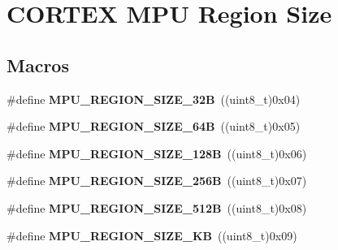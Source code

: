 \hypertarget{group___c_o_r_t_e_x___m_p_u___region___size}{}\section{C\+O\+R\+T\+EX M\+PU Region Size}
\label{group___c_o_r_t_e_x___m_p_u___region___size}
\subsection*{Macros}
\begin{DoxyCompactItemize}
\item 
\#define {\bfseries M\+P\+U\+\_\+\+R\+E\+G\+I\+O\+N\+\_\+\+S\+I\+Z\+E\+\_\+32B}~((uint8\+\_\+t)0x04)\hypertarget{group___c_o_r_t_e_x___m_p_u___region___size_ga223180f22c228d8555500d519c9bc867}{}\label{group___c_o_r_t_e_x___m_p_u___region___size_ga223180f22c228d8555500d519c9bc867}

\item 
\#define {\bfseries M\+P\+U\+\_\+\+R\+E\+G\+I\+O\+N\+\_\+\+S\+I\+Z\+E\+\_\+64B}~((uint8\+\_\+t)0x05)\hypertarget{group___c_o_r_t_e_x___m_p_u___region___size_gae9860f1ce67c21a09843de8f074dbd0c}{}\label{group___c_o_r_t_e_x___m_p_u___region___size_gae9860f1ce67c21a09843de8f074dbd0c}

\item 
\#define {\bfseries M\+P\+U\+\_\+\+R\+E\+G\+I\+O\+N\+\_\+\+S\+I\+Z\+E\+\_\+128B}~((uint8\+\_\+t)0x06)\hypertarget{group___c_o_r_t_e_x___m_p_u___region___size_gabe22ba414d2be40ed4e8a00d038e912f}{}\label{group___c_o_r_t_e_x___m_p_u___region___size_gabe22ba414d2be40ed4e8a00d038e912f}

\item 
\#define {\bfseries M\+P\+U\+\_\+\+R\+E\+G\+I\+O\+N\+\_\+\+S\+I\+Z\+E\+\_\+256B}~((uint8\+\_\+t)0x07)\hypertarget{group___c_o_r_t_e_x___m_p_u___region___size_ga61edd3acbc4e22b986b83c9f683ab265}{}\label{group___c_o_r_t_e_x___m_p_u___region___size_ga61edd3acbc4e22b986b83c9f683ab265}

\item 
\#define {\bfseries M\+P\+U\+\_\+\+R\+E\+G\+I\+O\+N\+\_\+\+S\+I\+Z\+E\+\_\+512B}~((uint8\+\_\+t)0x08)\hypertarget{group___c_o_r_t_e_x___m_p_u___region___size_ga91c1cb8a9a60f061b10ff5a1ad588007}{}\label{group___c_o_r_t_e_x___m_p_u___region___size_ga91c1cb8a9a60f061b10ff5a1ad588007}

\item 
\#define {\bfseries M\+P\+U\+\_\+\+R\+E\+G\+I\+O\+N\+\_\+\+S\+I\+Z\+E\+\_\+KB}~((uint8\+\_\+t)0x09)\hypertarget{group___c_o_r_t_e_x___m_p_u___region___size_ga9e642bd4d68832d1745ebebd55658c3b}{}\label{group___c_o_r_t_e_x___m_p_u___region___size_ga9e642bd4d68832d1745ebebd55658c3b}


\end{DoxyCompactItemize}
